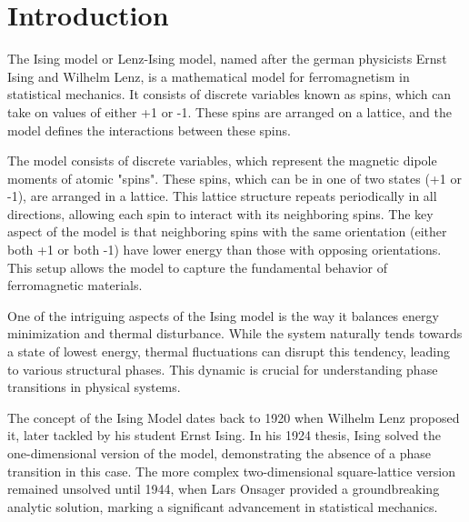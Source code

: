 \section{Introduction}

The Ising model or  Lenz-Ising model, named after the german physicists Ernst
Ising and  Wilhelm Lenz, is a mathematical model for ferromagnetism in
statistical mechanics. It consists of discrete variables known as spins, which
can take on values of either +1 or -1. These spins are arranged on a lattice,
and the model defines the interactions between these spins.

The model consists of discrete variables, which represent the magnetic dipole
moments of atomic "spins". These spins, which can be in one of two states (+1 or
-1), are arranged in a lattice. This lattice structure repeats periodically in
all directions, allowing each spin to interact with its neighboring spins. The
key aspect of the model is that neighboring spins with the same orientation
(either both +1 or both -1) have lower energy than those with opposing
orientations. This setup allows the model to capture the fundamental behavior of
ferromagnetic materials.

One of the intriguing aspects of the Ising model is the way it balances energy
minimization and thermal disturbance. While the system naturally tends towards a
state of lowest energy, thermal fluctuations can disrupt this tendency, leading
to various structural phases. This dynamic is crucial for understanding phase
transitions in physical systems.

The concept of the Ising Model dates back to 1920 when Wilhelm Lenz proposed it,
later tackled by his student Ernst Ising. In his 1924 thesis, Ising solved the
one-dimensional version of the model, demonstrating the absence of a phase
transition in this case. The more complex two-dimensional square-lattice version
remained unsolved until 1944, when Lars Onsager provided a groundbreaking
analytic solution, marking a significant advancement in statistical mechanics.
